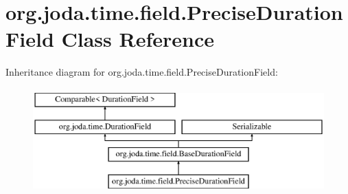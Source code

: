 \hypertarget{classorg_1_1joda_1_1time_1_1field_1_1_precise_duration_field}{\section{org.\-joda.\-time.\-field.\-Precise\-Duration\-Field Class Reference}
\label{classorg_1_1joda_1_1time_1_1field_1_1_precise_duration_field}
}
Inheritance diagram for org.\-joda.\-time.\-field.\-Precise\-Duration\-Field\-:\begin{figure}[H]
\begin{center}
\leavevmode
\includegraphics[height=4.000000cm]{classorg_1_1joda_1_1time_1_1field_1_1_precise_duration_field}
\end{center}
\end{figure}
